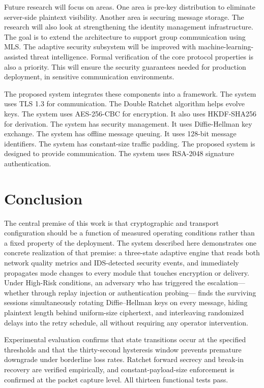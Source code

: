 \documentclass[conference]{IEEEtran}
\begin{document}
Future research will focus on areas.
One area is pre-key distribution to eliminate server-side plaintext visibility.
Another area is securing message storage.
The research will also look at strengthening the identity management infrastructure.
The goal is to extend the architecture to support group communication using MLS.
The adaptive security subsystem will be improved with machine-learning-assisted threat intelligence.
Formal verification of the core protocol properties is also a priority.
This will ensure the security guarantees needed for production deployment, in sensitive communication environments.

The proposed system integrates these components into a framework.
The system uses TLS 1.3 for communication.
The Double Ratchet algorithm helps evolve keys.
The system uses AES-256-CBC for encryption.
It also uses HKDF-SHA256 for derivation.
The system has security management.
It uses Diffie-Hellman key exchange.
The system has offline message queuing.
It uses 128-bit message identifiers.
The system has constant-size traffic padding.
The proposed system is designed to provide communication.
The system uses RSA-2048 signature authentication.

\section{Conclusion}

The central premise of this work is that cryptographic and transport configuration
should be a function of measured operating conditions rather than a fixed property of
the deployment. The system described here demonstrates one concrete realization of that
premise: a three-state adaptive engine that reads both network quality metrics and
IDS-detected security events, and immediately propagates mode changes to every module
that touches encryption or delivery. Under High-Risk conditions, an adversary who has
triggered the escalation—whether through replay injection or authentication probing—
finds the surviving sessions simultaneously rotating Diffie--Hellman keys on every
message, hiding plaintext length behind uniform-size ciphertext, and interleaving
randomized delays into the retry schedule, all without requiring any operator
intervention.

Experimental evaluation confirms that state transitions occur at the specified
thresholds and that the thirty-second hysteresis window prevents premature downgrade
under borderline loss rates. Ratchet forward secrecy and break-in recovery are verified
empirically, and constant-payload-size enforcement is confirmed at the packet capture
level. All thirteen functional tests pass.
\end{document}
